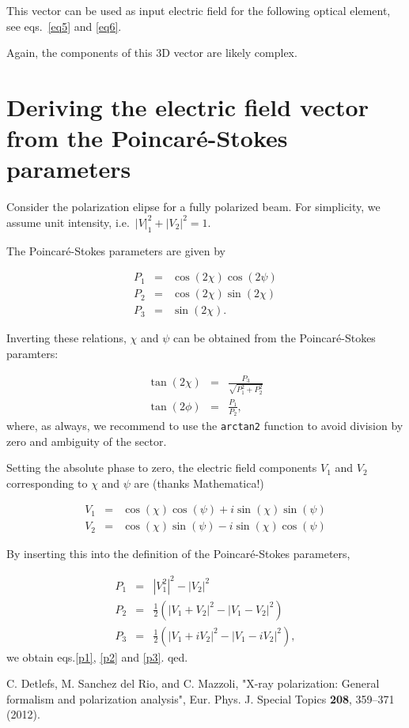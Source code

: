 \documentclass{article}
\begin{document}
This vector can be used as input electric field for the following optical element, see eqs.~\ref{eq5} and \ref{eq6}.

Again, the components of this 3D vector are likely complex.

\section{Deriving the electric field vector from the Poincar{\'e}-Stokes parameters}

Consider the polarization elipse \cite{Detlefs2012} for a fully polarized beam. For simplicity, we assume unit intensity, i.e.~$\left|V\right|_1^2 + \left|V_2\right|^2=1$.

The Poincar{\'e}-Stokes parameters are given by \cite{Detlefs20212}

\begin{eqnarray}
  P_1 &=& \cos(2\chi) \cos(2\psi) \label{p1} \\
  P_2 &=& \cos(2\chi) \sin(2\chi) \label{p2} \\
  P_3 &=& \sin(2\chi). \label{p3}
\end{eqnarray}

Inverting these relations, $\chi$ and $\psi$ can be obtained from the Poincar{\'e}-Stokes paramters:

\begin{eqnarray}
  \tan(2\chi) &=& \frac{P_3}{\sqrt{P_1^2 + P_2^2}} \\
  \tan(2\phi) &=& \frac{P_1}{P_2},
\end{eqnarray}
where, as always, we recommend to use the \texttt{arctan2} function to avoid division by zero and ambiguity of the sector.

Setting the absolute phase to zero, the electric field components $V_1$ and $V_2$ corresponding to $\chi$ and $\psi$ are (thanks Mathematica!)

\begin{eqnarray}
  V_1 &=& \cos(\chi) \cos(\psi) + i \sin(\chi) \sin(\psi) \\
  V_2 &=& \cos(\chi) \sin(\psi) - i \sin(\chi) \cos(\psi)
\end{eqnarray}

By inserting this into the definition of the Poincar{\'e}-Stokes parameters,

\begin{eqnarray}
  P_1
  &=&
  \left| V_1^2 \right|^2 - \left|V_2\right|^2 \\
  P_2
  &=&
  \frac{1}{2} \left( \left| V_1 + V_2 \right|^2 - \left| V_1 - V_2\right|^2 \right) \\
  P_3
  &=&
  \frac{1}{2} \left( \left| V_1 + i V_2 \right|^2 - \left| V_1 - i V_2\right|^2 \right) ,
\end{eqnarray}
we obtain eqs.\ref{p1}, \ref{p2} and \ref{p3}. qed.

\begin{thebibliography}{9}

 C. Detlefs, M. Sanchez del Rio, and C. Mazzoli, "X-ray polarization: General formalism and polarization analysis", Eur. Phys. J. Special Topics \textbf{208}, 359--371 (2012). 

\end{thebibliography}
\end{document}
